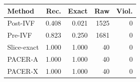 \begin{tabular}{lrrrr}
\toprule
Method & Rec. & Exact & Raw & Viol.\\
\midrule
Post-IVF & 0.408 & 0.021 & 1525 & 0\\
Pre-IVF & 0.823 & 0.250 & 1681 & 0\\
Slice-exact & 1.000 & 1.000 & 40 & 0\\
PACER-A & 1.000 & 1.000 & 40 & 0\\
PACER-X & 1.000 & 1.000 & 40 & 0\\
\bottomrule
\end{tabular}